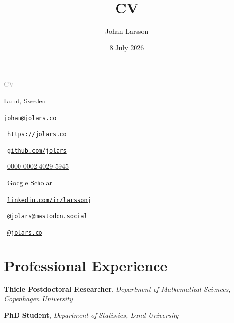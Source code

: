 \documentclass[
  a4paper,
]{article}
\title{CV}
\author{Johan Larsson}
\date{8 July 2026}
\providecommand{\tightlist}{%
  \setlength{\itemsep}{0pt}\setlength{\parskip}{0pt}}
\begin{document}
\fancyhead{}

\pagestyle{fancy}
\thispagestyle{plain}

{\large\textcolor{darkgray}{CV}}\smallskip

\smallskip


\baselineskip

\begin{minipage}[t]{0.5\textwidth}
    \small\noindent Lund, Sweden
  
    \href{mailto:johan@jolars.co}{\nolinkurl{johan@jolars.co}}
  
  \end{minipage}%
\begin{minipage}[t]{0.5\textwidth}
  \raggedleft\small

    {\faHouse}\,
  \href{https://jolars.co}{\nolinkurl{https://jolars.co}}
  
  
    {\faGithub}\,
  \href{https://github.com/jolars}{\nolinkurl{github.com/jolars}}
  
    {\aiOrcid}\,
  \href{https://orcid.org/0000-0002-4029-5945}{0000-0002-4029-5945}
  
  
    {\aiGoogleScholar}\, \href{https://scholar.google.com/citations?user=DCJvywYAAAAJ}{Google Scholar}
  
    {\faLinkedin}\,
  \href{https://www.linkedin.com/in/larssonj}{\nolinkurl{linkedin.com/in/larssonj}}
  
      {\faMastodon}\,
  \href{https://mastodon.social/@jolars}{\nolinkurl{@jolars@mastodon.social}}
    
    {\faBluesky}\,
  \href{https://bsky.app/profile/jolars.co}{\nolinkurl{@jolars.co}}
  \end{minipage}

\section{Professional Experience}\label{professional-experience}

\begin{description}
\tightlist
\item[2024--present]
\textbf{Thiele Postdoctoral Researcher}, \emph{Department of
Mathematical Sciences, Copenhagen University}
\item[2018--2024]
\textbf{PhD Student}, \emph{Department of Statistics, Lund University}
\end{description}
\end{document}
